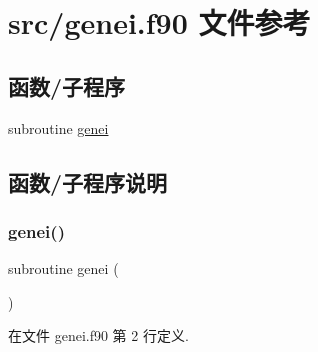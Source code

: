 \hypertarget{genei_8f90}{}\section{src/genei.f90 文件参考}
\label{genei_8f90}
\subsection*{函数/子程序}
\begin{DoxyCompactItemize}
\item 
subroutine \mbox{\hyperlink{genei_8f90_a241d04bd31d16965e0054d97f2809420}{genei}}
\end{DoxyCompactItemize}


\subsection{函数/子程序说明}
\mbox{\label{genei_8f90_a241d04bd31d16965e0054d97f2809420}} 
\subsubsection{\texorpdfstring{genei()}{genei()}}
{\footnotesize\ttfamily subroutine genei (\begin{DoxyParamCaption}{ }\end{DoxyParamCaption})}



在文件 genei.\+f90 第 2 行定义.

